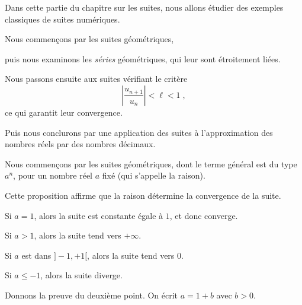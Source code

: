 






\debuttexte

\diapo

\change

Dans cette partie du chapitre sur les suites, 
nous allons étudier des exemples classiques de suites numériques.

\change

Nous commençons par les suites géométriques,

\change

puis nous examinons les \emph{séries} géométriques, qui leur sont étroitement liées.

\change

Nous passons ensuite aux suites vérifiant le critère 
$$\left|\frac{u_{n+1}}{u_n}\right|<\ell<1 \; ,$$ ce qui garantit leur convergence.

\change 

Puis nous conclurons par une application des suites à l'approximation 
des nombres réels par des nombres décimaux.

\diapo

Nous commençons par les suites géométriques, 
dont le terme général est du type $a^n$, 
pour un nombre réel $a$ fixé (qui s'appelle la raison).


Cette proposition affirme que la raison détermine la convergence de la suite.

\change

Si $a=1$, alors la suite est constante égale à $1$, et donc converge.

\change

Si $a>1$, alors la suite tend vers $+\infty$.

\change 

Si $a$ est dans $]-1,+1[$, alors la suite tend vers $0$.

\change

Si $a\le-1$, alors la suite diverge.

\change

Donnons la preuve du deuxième point. On écrit
$a=1+b$ avec $b>0$. 

\change

